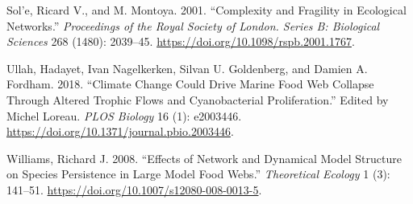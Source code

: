 \documentclass{article}
\newlength{\cslhangindent}
\newlength{\cslentryspacingunit} %
\newenvironment{CSLReferences}[2] %
 {%
  \setlength{\parindent}{0pt}
  \ifodd #1
  \let\oldpar\par
  \def\par{\hangindent=\cslhangindent\oldpar}
  \fi
  \setlength{\parskip}{#2\cslentryspacingunit}
 }%
 {}
\begin{document}
\begin{CSLReferences}{1}{0}
\leavevmode{}%
Sol'e, Ricard V., and M. Montoya. 2001. {``Complexity and Fragility in
Ecological Networks.''} \emph{Proceedings of the Royal Society of
London. Series B: Biological Sciences} 268 (1480): 2039--45.
\url{https://doi.org/10.1098/rspb.2001.1767}.

\leavevmode{}%
Ullah, Hadayet, Ivan Nagelkerken, Silvan U. Goldenberg, and Damien A.
Fordham. 2018. {``Climate Change Could Drive Marine Food Web Collapse
Through Altered Trophic Flows and Cyanobacterial Proliferation.''}
Edited by Michel Loreau. \emph{PLOS Biology} 16 (1): e2003446.
\url{https://doi.org/10.1371/journal.pbio.2003446}.

\leavevmode{}%
Williams, Richard J. 2008. {``Effects of Network and Dynamical Model
Structure on Species Persistence in Large Model Food Webs.''}
\emph{Theoretical Ecology} 1 (3): 141--51.
\url{https://doi.org/10.1007/s12080-008-0013-5}.

\end{CSLReferences}



\end{document}
